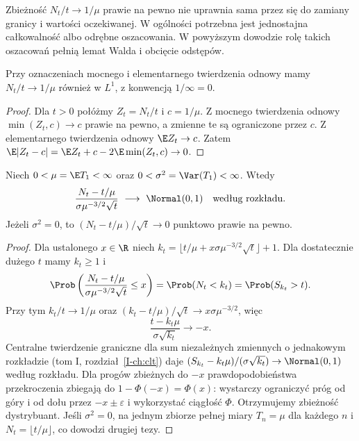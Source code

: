 \begin{uwaga}
Zbieżność $N_t/t\to1/\mu$ prawie na pewno nie uprawnia
sama przez się do zamiany granicy i wartości oczekiwanej.
W ogólności potrzebna jest jednostajna całkowalność
albo odrębne oszacowania. W powyższym dowodzie rolę takich
oszacowań pełnią lemat Walda i obcięcie odstępów.
\end{uwaga}

\begin{wniosek}
Przy oznaczeniach mocnego i elementarnego twierdzenia
odnowy mamy $N_t/t\to 1/\mu$ również w $L^1$,
z konwencją $1/\infty=0$.
\end{wniosek}
\begin{proof}
Dla $t>0$ połóżmy $Z_t=N_t/t$ i $c=1/\mu$.
Z mocnego twierdzenia odnowy $\min(Z_t,c)\to c$
prawie na pewno, a zmienne te są ograniczone przez $c$.
Z elementarnego twierdzenia odnowy $\E Z_t\to c$.
Zatem
$\E|Z_t-c|=\E Z_t+c-2\E\min(Z_t,c)\to0$.
\end{proof}

\begin{twierdzenie}
\label{thm:renewal-clt}
Niech $0<\mu=\E T_1<\infty$ oraz
$0<\sigma^2=\Var(T_1)<\infty$. Wtedy
\[
\frac{N_t-t/\mu}{\sigma\mu^{-3/2}\sqrt t}
\ \longrightarrow\ \Normal(0,1)
\quad\text{według rozkładu}.
\]
Jeżeli $\sigma^2=0$, to $(N_t-t/\mu)/\sqrt t\to0$
punktowo prawie na pewno.
\end{twierdzenie}
\begin{proof}
Dla ustalonego $x\in\R$ niech
$k_t=\lfloor t/\mu+x\sigma\mu^{-3/2}\sqrt t\rfloor+1$.
Dla dostatecznie dużego $t$ mamy $k_t\ge1$ i
\[
\Prob\left(\frac{N_t-t/\mu}{\sigma\mu^{-3/2}\sqrt t}
\le x\right)
=\Prob(N_t<k_t)
=\Prob(S_{k_t}>t).
\]
Przy tym $k_t/t\to1/\mu$ oraz
$(k_t-t/\mu)/\sqrt t\to x\sigma\mu^{-3/2}$,
więc
\[
\frac{t-k_t\mu}{\sigma\sqrt{k_t}}\to -x.
\]
Centralne twierdzenie graniczne dla sum niezależnych
zmiennych o jednakowym rozkładzie (tom I,
rozdział~\ref{I-ch:clt}) daje
$(S_{k_t}-k_t\mu)/(\sigma\sqrt{k_t})
\to\Normal(0,1)$ według rozkładu.
Dla progów zbieżnych do $-x$ prawdopodobieństwa
przekroczenia zbiegają do $1-\Phi(-x)=\Phi(x)$:
wystarczy ograniczyć próg od góry i od dołu przez
$-x\pm\varepsilon$ i wykorzystać ciągłość $\Phi$.
Otrzymujemy zbieżność dystrybuant.
Jeśli $\sigma^2=0$, na jednym zbiorze pełnej miary
$T_n=\mu$ dla każdego $n$ i $N_t=\lfloor t/\mu\rfloor$,
co dowodzi drugiej tezy.
\end{proof}

